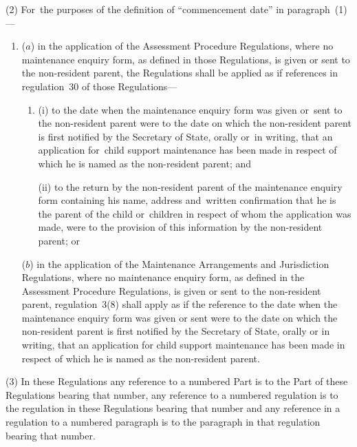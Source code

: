\documentclass[12pt,a4paper]{article}
\begin{document}
(2) For~the purposes of the definition of “commencement date” in paragraph~(1)—
\begin{enumerate}\item[]
($a$) in the application of the Assessment Procedure Regulations, where no maintenance enquiry form, as defined in those Regulations, is given or sent to the non-resident parent, the Regulations shall be applied as if references in regulation~30 of those Regulations—
\begin{enumerate}\item[]
(i) to the date when the maintenance enquiry form was given or~sent to the non-resident parent were to the date on which the non-resident parent is first notified by the Secretary of State, orally or~in writing, that an application for~child support maintenance has been made in respect of which he is named as the non-resident parent; and

(ii) to the return by the non-resident parent of the maintenance enquiry form containing his name, address and~written confirmation that he is the parent of the child or~children in respect of whom the application was made, were to the provision of this information by the non-resident parent; or
\end{enumerate}

($b$) in the application of the Maintenance Arrangements and Jurisdiction Regulations, where no maintenance enquiry form, as defined in the Assessment Procedure Regulations, is given or sent to the non-resident parent, regulation~3(8) shall apply as if the reference to the date when the maintenance enquiry form was given or sent were to the date on which the non-resident parent is first notified by the Secretary of State, orally or in writing, that an application for child support maintenance has been made in respect of which he is named as the non-resident parent.
\end{enumerate}

(3) In these Regulations any reference to a numbered Part is to the Part of these Regulations bearing that number, any reference to a numbered regulation is to the regulation in these Regulations bearing that number and any reference in a regulation to a numbered paragraph is to the paragraph in that regulation bearing that number.

\end{document}
